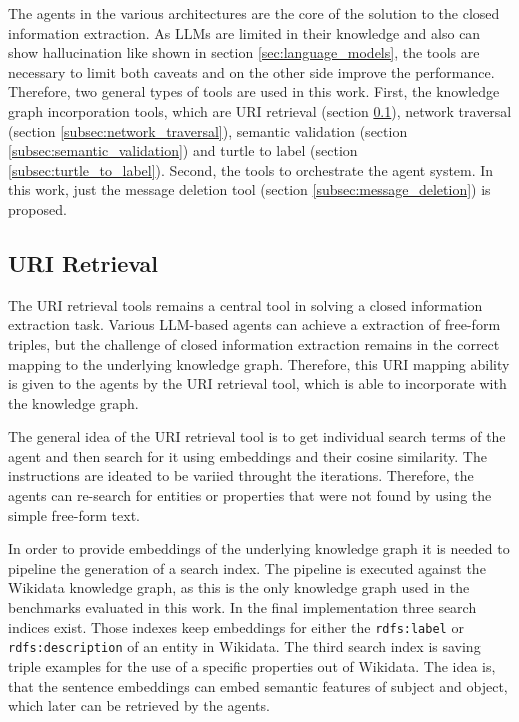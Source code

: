 \documentclass[a4paper,oneside,bibliography=totoc]{scrbook}
\begin{document}
The agents in the various architectures are the core of the solution to the closed information extraction. As \acp{LLM} are limited in their knowledge and also can show hallucination like shown in section \ref{sec:language_models}, the tools are necessary to limit both caveats and on the other side improve the performance. Therefore, two general types of tools are used in this work. First, the knowledge graph incorporation tools, which are URI retrieval (section \ref{subsec:uri_retrieval}), network traversal (section \ref{subsec:network_traversal}), semantic validation (section \ref{subsec:semantic_validation}) and turtle to label (section \ref{subsec:turtle_to_label}). Second, the tools to orchestrate the agent system. In this work, just the message deletion tool (section \ref{subsec:message_deletion}) is proposed.

\subsection{URI Retrieval}
\label{subsec:uri_retrieval}

The URI retrieval tools remains a central tool in solving a closed information extraction task. Various \ac{LLM}-based agents can achieve a extraction of free-form triples, but the challenge of closed information extraction remains in the correct mapping to the underlying knowledge graph. Therefore, this URI mapping ability is given to the agents by the URI retrieval tool, which is able to incorporate with the knowledge graph.

The general idea of the URI retrieval tool is to get individual search terms of the agent and then search for it using embeddings and their cosine similarity. The instructions are ideated to be variied throught the iterations. Therefore, the agents can re-search for entities or properties that were not found by using the simple free-form text.

In order to provide embeddings of the underlying knowledge graph it is needed to pipeline the generation of a search index. The pipeline is executed against the Wikidata knowledge graph, as this is the only knowledge graph used in the benchmarks evaluated in this work. In the final implementation three search indices exist. Those indexes keep embeddings for either the \texttt{rdfs:label} or \texttt{rdfs:description} of an entity in Wikidata. The third search index is saving triple examples for the use of a specific properties out of Wikidata. The idea is, that the sentence embeddings can embed semantic features of subject and object, which later can be retrieved by the agents.
\end{document}
